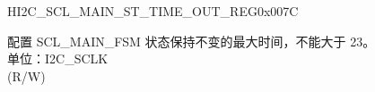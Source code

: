 \begin{register}{H}{I2C\_SCL\_MAIN\_ST\_TIME\_OUT\_REG}{0x007C}\label{regdesc:I2CSCLMAINSTTIMEOUTREG}
%
%
\regnewline%
\begin{regdesc}\begin{reglist}
\label{fielddesc:I2CSCLMAINSTTOI2C}\item [I2C\_SCL\_MAIN\_ST\_TO\_I2C] 配置 SCL\_MAIN\_FSM 状态保持不变的最大时间，不能大于 23。\\
单位：I2C\_SCLK \\ (R/W)
\end{reglist}\end{regdesc}
\end{register}


